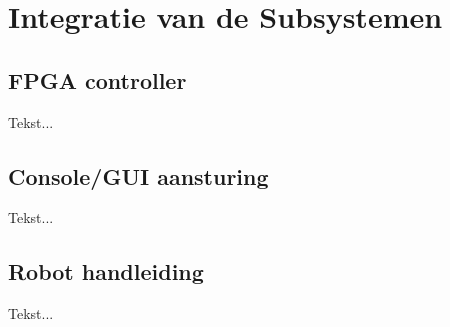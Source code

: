 \chapter[Integratie van de Subsystemen]{Integratie van de Subsystemen} \label {chapter:integratie}

	\section{FPGA controller}
		Tekst...
	\section{Console/GUI aansturing}
		Tekst...
	\section{Robot handleiding}
		Tekst...

